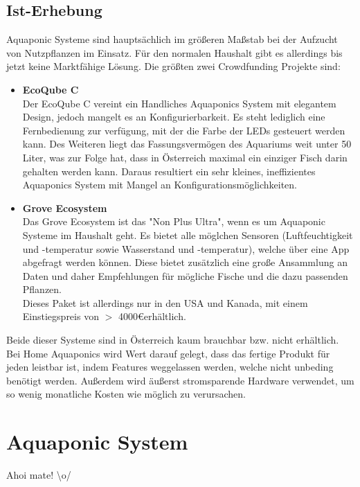 \documentclass[11pt]{article}
\begin{document}
\subsection{Ist-Erhebung}
Aquaponic Systeme sind haupts\"achlich im gr\"o{\ss}eren Ma{\ss}stab bei der Aufzucht von Nutzpflanzen im Einsatz. F\"ur den normalen Haushalt gibt es allerdings bis jetzt keine Marktf\"ahige L\"osung. Die gr\"o{\ss}ten zwei Crowdfunding Projekte sind:
\begin{itemize}
	\item \textbf{EcoQube C}\\
		Der EcoQube C vereint ein Handliches Aquaponics System mit elegantem Design, jedoch mangelt es an Konfigurierbarkeit. Es steht lediglich eine Fernbedienung zur verf\"ugung, mit der die Farbe der LEDs gesteuert werden kann. Des Weiteren liegt das Fassungsverm\"ogen des Aquariums weit unter 50 Liter, was zur Folge hat, dass in \"Osterreich maximal ein einziger Fisch darin gehalten werden kann. Daraus resultiert ein sehr kleines, ineffizientes Aquaponics System mit Mangel an Konfigurationsm\"oglichkeiten. \\
	\item \textbf{Grove Ecosystem}\\
	Das Grove Ecosystem ist das "Non Plus Ultra", wenn es um Aquaponic Systeme im Haushalt geht. Es bietet alle m\"oglchen Sensoren (Luftfeuchtigkeit und -temperatur sowie Wasserstand und -temperatur), welche \"uber eine App abgefragt werden k\"onnen. Diese bietet zus\"atzlich eine gro{\ss}e Ansammlung an Daten und daher Empfehlungen f\"ur m\"ogliche Fische und die dazu passenden Pflanzen. \\
	Dieses Paket ist allerdings nur in den USA und Kanada, mit einem Einstiegspreis von $>$ 4000\euro\hspace{0.5em}erh\"altlich.
\end{itemize}
Beide dieser Systeme sind in \"Osterreich kaum brauchbar bzw. nicht erh\"altlich. Bei Home Aquaponics wird Wert darauf gelegt, dass das fertige Produkt f\"ur jeden leistbar ist, indem Features weggelassen werden, welche nicht unbeding ben\"otigt werden. Au{\ss}erdem wird \"au{\ss}erst stromsparende Hardware verwendet, um so wenig monatliche Kosten wie m\"oglich zu verursachen.

\section{Aquaponic System}
Ahoi mate! \textbackslash o/\\
\end{document}
